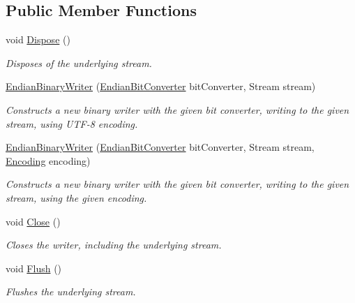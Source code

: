 \subsection*{Public Member Functions}
\begin{DoxyCompactItemize}
\item 
void \mbox{\hyperlink{class_t_net_1_1_i_o_1_1_endian_binary_writer_ac0797444b37f38d00da40ce86afa5b53}{Dispose}} ()
\begin{DoxyCompactList}\small\item\em Disposes of the underlying stream. \end{DoxyCompactList}\item 
\mbox{\hyperlink{class_t_net_1_1_i_o_1_1_endian_binary_writer_a3e6bc74a2340282fa8ca4d5613bb1012}{Endian\+Binary\+Writer}} (\mbox{\hyperlink{class_t_net_1_1_i_o_1_1_endian_bit_converter}{Endian\+Bit\+Converter}} bit\+Converter, Stream stream)
\begin{DoxyCompactList}\small\item\em Constructs a new binary writer with the given bit converter, writing to the given stream, using U\+T\+F-\/8 encoding. \end{DoxyCompactList}\item 
\mbox{\hyperlink{class_t_net_1_1_i_o_1_1_endian_binary_writer_acd0e9fbe6e0482fc70983ebfcee982b7}{Endian\+Binary\+Writer}} (\mbox{\hyperlink{class_t_net_1_1_i_o_1_1_endian_bit_converter}{Endian\+Bit\+Converter}} bit\+Converter, Stream stream, \mbox{\hyperlink{class_t_net_1_1_i_o_1_1_endian_binary_writer_a0148eabc0f952c96b0a43d364c60c03b}{Encoding}} encoding)
\begin{DoxyCompactList}\small\item\em Constructs a new binary writer with the given bit converter, writing to the given stream, using the given encoding. \end{DoxyCompactList}\item 
void \mbox{\hyperlink{class_t_net_1_1_i_o_1_1_endian_binary_writer_a28eb1d1d1ef4b2f5cc765ea7c07bb518}{Close}} ()
\begin{DoxyCompactList}\small\item\em Closes the writer, including the underlying stream. \end{DoxyCompactList}\item 
void \mbox{\hyperlink{class_t_net_1_1_i_o_1_1_endian_binary_writer_a85a03d23017436099171177d580bc490}{Flush}} ()
\begin{DoxyCompactList}\small\item\em Flushes the underlying stream. \end{DoxyCompactList}\item 

\end{DoxyCompactItemize}
